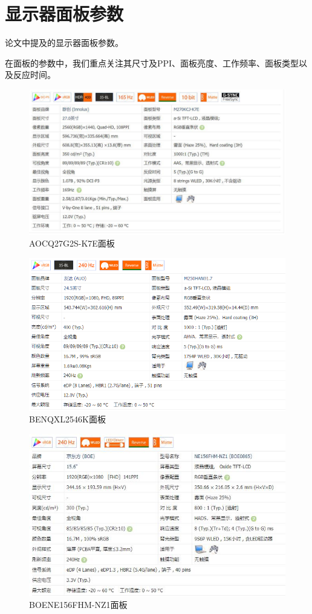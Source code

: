 \chapter{显示器面板参数}
论文中提及的显示器面板参数。

在面板的参数中，我们重点关注其尺寸及PPI、面板亮度、工作频率、面板类型以及反应时间。

\begin{figure}[!htbp]
\centering
\includegraphics[scale=0.5]{figures/HW/PA_A.png}
\caption{AOCQ27G2S-K7E面板}
\end{figure}

\begin{figure}[!htbp]
\centering
\includegraphics[scale=0.8]{figures/HW/PA_B.png}
\caption{BENQXL2546K面板}
\end{figure}

\begin{figure}[!htbp]
\centering
\includegraphics[scale=0.8]{figures/HW/PA_C.png}
\caption{BOENE156FHM-NZ1面板}
\end{figure}

